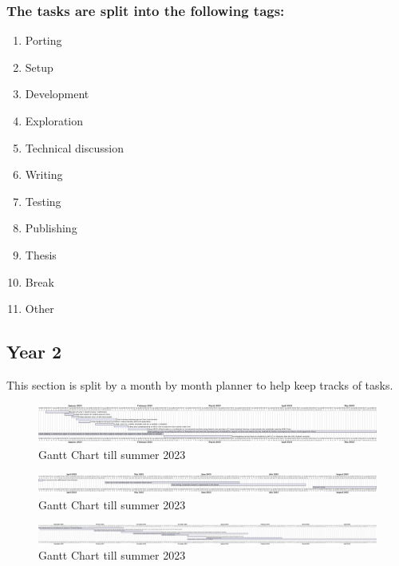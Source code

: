 \subsubsection{The tasks are split into the following tags:}
\begin{enumerate}
  \item Porting 
  \item Setup
  \item Development
  \item Exploration 
  \item Technical discussion 
  \item Writing
  \item Testing
  \item Publishing
  \item Thesis
  \item Break
  \item Other
\end{enumerate}


\subsection{Year 2}
This section is split by a month by month planner to help keep tracks of tasks. 
\begin{figure}[htbp!] 
  \centering    
  \includegraphics[width=1.2\textwidth]{gnatt-1}
  \caption[Planner]{Gantt Chart till summer 2023}
  \label{fig:Gantt Chart}
  \end{figure}
  \begin{figure}[htbp!] 
    \centering    
    \includegraphics[width=1.2\textwidth]{gnatt-2}
    \caption[Planner]{Gantt Chart till summer 2023}
    \label{fig:Gantt Chart}
    \end{figure}
    \begin{figure}[htbp!] 
      \centering    
      \includegraphics[width=1.2\textwidth]{gnatt-3}
      \caption[Planner]{Gantt Chart till summer 2023}
      \label{fig:Gantt Chart}
      \end{figure}

